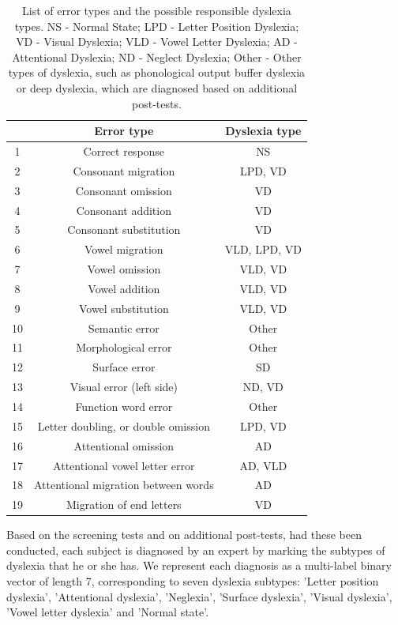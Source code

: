 \begin{table}

\centering
\begin{tabular}{|c|c|c|} \hline

& Error type & Dyslexia type\\
\hline
1 & Correct response & NS\\
2 & Consonant migration & LPD, VD\\
3 & Consonant omission & VD\\
4 & Consonant addition & VD\\
5 & Consonant substitution & VD\\
6 & Vowel migration & VLD, LPD, VD\\
7 & Vowel omission & VLD, VD\\
8 & Vowel addition & VLD, VD\\
9 & Vowel substitution & VLD, VD\\
10 & Semantic error & Other\\
11 & Morphological error & Other\\
12 & Surface error & SD\\
13 & Visual error (left side) & ND, VD\\
14 & Function word error & Other\\
15 & Letter doubling, or double omission & LPD, VD\\
16 & Attentional omission & AD\\
17 & Attentional vowel letter error & AD, VLD\\
18 & Attentional migration between words & AD\\
19 & Migration of end letters & VD\\

\hline\end{tabular}
\bigskip
\caption{List of error types and the possible responsible dyslexia types. NS - Normal State; LPD - Letter Position Dyslexia; VD - Visual Dyslexia; VLD - Vowel Letter Dyslexia; AD - Attentional Dyslexia; ND - Neglect Dyslexia; Other - Other types of dyslexia, such as phonological output buffer dyslexia or deep dyslexia, which are diagnosed based on additional post-tests.}
\end{table}

Based on the screening tests and on additional post-tests, had these been conducted, each subject is diagnosed by an expert by marking the subtypes of dyslexia that he or she has. We represent each diagnosis as a multi-label binary vector of length 7, corresponding to seven dyslexia subtypes: 'Letter position dyslexia', 'Attentional dyslexia', 'Neglexia', 'Surface dyslexia', 'Visual dyslexia', 'Vowel letter dyslexia' and 'Normal state'.

